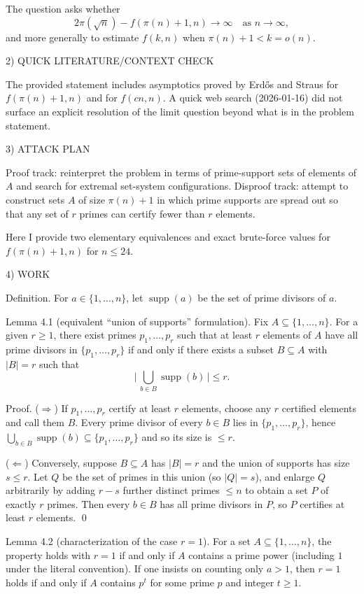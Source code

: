 The question asks whether
\[
2\pi(\sqrt n)-f(\pi(n)+1,n)\to\infty\quad\text{as }n\to\infty,
\]
and more generally to estimate $f(k,n)$ when $\pi(n)+1<k=o(n)$.

2) QUICK LITERATURE/CONTEXT CHECK

The provided statement includes asymptotics proved by Erd\H{o}s and Straus for $f(\pi(n)+1,n)$ and for $f(cn,n)$.
A quick web search (2026-01-16) did not surface an explicit resolution of the limit question beyond what is in the problem statement.

3) ATTACK PLAN

Proof track: reinterpret the problem in terms of prime-support sets of elements of $A$ and search for extremal set-system configurations.
Disproof track: attempt to construct sets $A$ of size $\pi(n)+1$ in which prime supports are spread out so that any set of $r$ primes can certify fewer than $r$ elements.

Here I provide two elementary equivalences and exact brute-force values for $f(\pi(n)+1,n)$ for $n\le 24$.

4) WORK

Definition.
For $a\in\{1,\dots,n\}$, let $\operatorname{supp}(a)$ be the set of prime divisors of $a$.

Lemma 4.1 (equivalent ``union of supports'' formulation).
Fix $A\subseteq\{1,\dots,n\}$.
For a given $r\ge 1$, there exist primes $p_1,\dots,p_r$ such that at least $r$ elements of $A$ have all prime divisors in $\{p_1,\dots,p_r\}$
if and only if there exists a subset $B\subseteq A$ with $|B|=r$ such that
\[
\bigl|\,\bigcup_{b\in B}\operatorname{supp}(b)\,\bigr|\le r.
\]

Proof.
($\Rightarrow$) If $p_1,\dots,p_r$ certify at least $r$ elements, choose any $r$ certified elements and call them $B$.
Every prime divisor of every $b\in B$ lies in $\{p_1,\dots,p_r\}$, hence
$\bigcup_{b\in B}\operatorname{supp}(b)\subseteq\{p_1,\dots,p_r\}$ and so its size is $\le r$.

($\Leftarrow$) Conversely, suppose $B\subseteq A$ has $|B|=r$ and the union of supports has size $s\le r$.
Let $Q$ be the set of primes in this union (so $|Q|=s$), and enlarge $Q$ arbitrarily by adding $r-s$ further distinct primes $\le n$ to obtain a set $P$ of exactly $r$ primes.
Then every $b\in B$ has all prime divisors in $P$, so $P$ certifies at least $r$ elements.
\qed

Lemma 4.2 (characterization of the case $r=1$).
For a set $A\subseteq\{1,\dots,n\}$, the property holds with $r=1$ if and only if $A$ contains a prime power (including $1$ under the literal convention).
If one insists on counting only $a>1$, then $r=1$ holds if and only if $A$ contains $p^t$ for some prime $p$ and integer $t\ge 1$.


